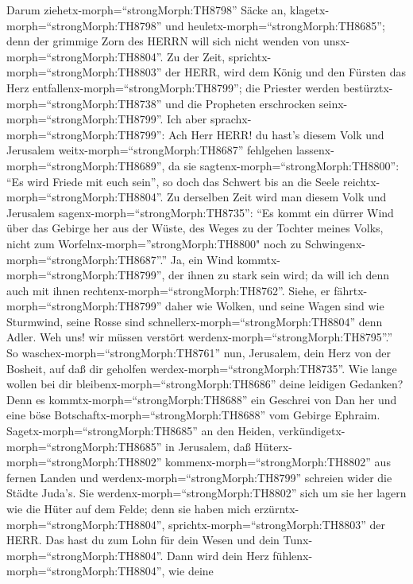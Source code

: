 Darum ziehetx-morph=``strongMorph:TH8798'' Säcke an,
klagetx-morph=``strongMorph:TH8798'' und
heuletx-morph=``strongMorph:TH8685''; denn der grimmige Zorn des HERRN
will sich nicht wenden von unsx-morph=``strongMorph:TH8804''.
 Zu der Zeit, sprichtx-morph=``strongMorph:TH8803'' der
HERR, wird dem König und den Fürsten das Herz
entfallenx-morph=``strongMorph:TH8799''; die Priester werden
bestürztx-morph=``strongMorph:TH8738'' und die Propheten erschrocken
seinx-morph=``strongMorph:TH8799''.  Ich aber
sprachx-morph=``strongMorph:TH8799'': Ach Herr HERR! du hast's diesem
Volk und Jerusalem weitx-morph=``strongMorph:TH8687'' fehlgehen
lassenx-morph=``strongMorph:TH8689'', da sie
sagtenx-morph=``strongMorph:TH8800'': ``Es wird Friede mit euch sein'',
so doch das Schwert bis an die Seele
reichtx-morph=``strongMorph:TH8804''.  Zu derselben Zeit
wird man diesem Volk und Jerusalem sagenx-morph=``strongMorph:TH8735'':
``Es kommt ein dürrer Wind über das Gebirge her aus der Wüste, des Weges
zu der Tochter meines Volks, nicht zum
Worfelnx-morph=''strongMorph:TH8800" noch zu
Schwingenx-morph=``strongMorph:TH8687''.''  Ja, ein Wind
kommtx-morph=``strongMorph:TH8799'', der ihnen zu stark sein wird; da
will ich denn auch mit ihnen rechtenx-morph=``strongMorph:TH8762''.
 Siehe, er fährtx-morph=``strongMorph:TH8799'' daher wie
Wolken, und seine Wagen sind wie Sturmwind, seine Rosse sind
schnellerx-morph=``strongMorph:TH8804'' denn Adler. Weh uns! wir müssen
verstört werdenx-morph=``strongMorph:TH8795''.''  So
waschex-morph=``strongMorph:TH8761'' nun, Jerusalem, dein Herz von der
Bosheit, auf daß dir geholfen werdex-morph=``strongMorph:TH8735''. Wie
lange wollen bei dir bleibenx-morph=``strongMorph:TH8686'' deine
leidigen Gedanken?  Denn es
kommtx-morph=``strongMorph:TH8688'' ein Geschrei von Dan her und eine
böse Botschaftx-morph=``strongMorph:TH8688'' vom Gebirge Ephraim.
 Sagetx-morph=``strongMorph:TH8685'' an den Heiden,
verkündigetx-morph=``strongMorph:TH8685'' in Jerusalem, daß
Hüterx-morph=``strongMorph:TH8802'' kommenx-morph=``strongMorph:TH8802''
aus fernen Landen und werdenx-morph=``strongMorph:TH8799'' schreien
wider die Städte Juda's.  Sie
werdenx-morph=``strongMorph:TH8802'' sich um sie her lagern wie die
Hüter auf dem Felde; denn sie haben mich
erzürntx-morph=``strongMorph:TH8804'',
sprichtx-morph=``strongMorph:TH8803'' der HERR.  Das hast
du zum Lohn für dein Wesen und dein Tunx-morph=``strongMorph:TH8804''.
Dann wird dein Herz fühlenx-morph=``strongMorph:TH8804'', wie deine
